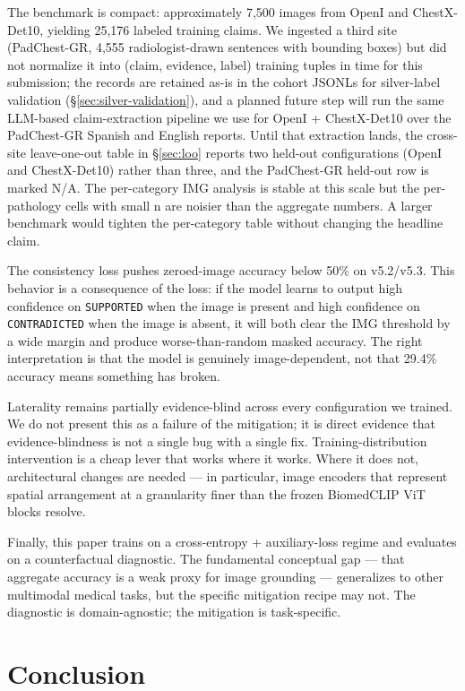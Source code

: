 \documentclass[pmlr]{jmlr}
\begin{document}
The benchmark is compact: approximately 7{,}500 images from OpenI and ChestX-Det10, yielding 25{,}176 labeled training claims. We ingested a third site (PadChest-GR, 4{,}555 radiologist-drawn sentences with bounding boxes) but did not normalize it into (claim, evidence, label) training tuples in time for this submission; the records are retained as-is in the cohort JSONLs for silver-label validation (§\ref{sec:silver-validation}), and a planned future step will run the same LLM-based claim-extraction pipeline we use for OpenI + ChestX-Det10 over the PadChest-GR Spanish and English reports. Until that extraction lands, the cross-site leave-one-out table in §\ref{sec:loo} reports two held-out configurations (OpenI and ChestX-Det10) rather than three, and the PadChest-GR held-out row is marked N/A. The per-category IMG analysis is stable at this scale but the per-pathology cells with small n are noisier than the aggregate numbers. A larger benchmark would tighten the per-category table without changing the headline claim.

The consistency loss pushes zeroed-image accuracy below 50\% on v5.2/v5.3. This behavior is a consequence of the loss: if the model learns to output high confidence on \texttt{SUPPORTED} when the image is present and high confidence on \texttt{CONTRADICTED} when the image is absent, it will both clear the IMG threshold by a wide margin and produce worse-than-random masked accuracy. The right interpretation is that the model is genuinely image-dependent, not that 29.4\% accuracy means something has broken.

Laterality remains partially evidence-blind across every configuration we trained. We do not present this as a failure of the mitigation; it is direct evidence that evidence-blindness is not a single bug with a single fix. Training-distribution intervention is a cheap lever that works where it works. Where it does not, architectural changes are needed — in particular, image encoders that represent spatial arrangement at a granularity finer than the frozen BiomedCLIP ViT blocks resolve.

Finally, this paper trains on a cross-entropy + auxiliary-loss regime and evaluates on a counterfactual diagnostic. The fundamental conceptual gap — that aggregate accuracy is a weak proxy for image grounding — generalizes to other multimodal medical tasks, but the specific mitigation recipe may not. The diagnostic is domain-agnostic; the mitigation is task-specific.

\section{Conclusion}
\end{document}
